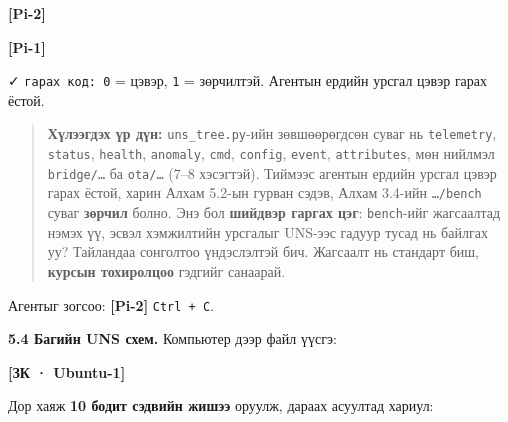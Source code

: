 \textbf{{[}Pi-2{]}}

\begin{Shaded}
\begin{Highlighting}[]
\KeywordTok{\&\&} 
\end{Highlighting}
\end{Shaded}

\textbf{{[}Pi-1{]}}

\begin{Shaded}
\begin{Highlighting}[]
 
 
\end{Highlighting}
\end{Shaded}

✓ \texttt{гарах\ код:\ 0} = цэвэр, \texttt{1} = зөрчилтэй. Агентын ердийн урсгал цэвэр гарах ёстой.

\begin{quote}
\textbf{Хүлээгдэх үр дүн:} \texttt{uns\_tree.py}-ийн зөвшөөрөгдсөн суваг нь \texttt{telemetry}, \texttt{status}, \texttt{health}, \texttt{anomaly}, \texttt{cmd}, \texttt{config}, \texttt{event}, \texttt{attributes}, мөн нийлмэл \texttt{bridge/\ldots{}} ба \texttt{ota/\ldots{}} (7--8 хэсэгтэй). Тиймээс агентын ердийн урсгал цэвэр гарах ёстой, харин Алхам 5.2-ын гурван сэдэв, Алхам 3.4-ийн \texttt{\ldots{}/bench} суваг \textbf{зөрчил} болно. Энэ бол \textbf{шийдвэр гаргах цэг}: \texttt{bench}-ийг жагсаалтад нэмэх үү, эсвэл хэмжилтийн урсгалыг UNS-ээс гадуур тусад нь байлгах уу? Тайландаа сонголтоо үндэслэлтэй бич. Жагсаалт нь стандарт биш, \textbf{курсын тохиролцоо} гэдгийг санаарай.
\end{quote}

Агентыг зогсоо: \textbf{{[}Pi-2{]}} \texttt{Ctrl\ +\ C}.

\textbf{5.4 Багийн UNS схем.} Компьютер дээр файл үүсгэ:

\textbf{{[}ЗК · Ubuntu-1{]}}

\begin{Shaded}
\begin{Highlighting}[]
\end{Highlighting}
\end{Shaded}

Дор хаяж \textbf{10 бодит сэдвийн жишээ} оруулж, дараах асуултад хариул:


